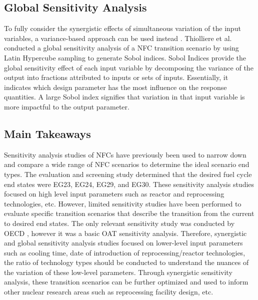 \subsection{Global Sensitivity Analysis}
\label{sec:sobol}
To fully consider the synergistic effects of
simultaneous variation of the input variables, a variance-based 
approach can be used instead \cite{thiolliere_methodology_2018}.
Thiolliere et al. conducted a global sensitivity analysis of a 
\gls{NFC} transition scenario by using Latin Hypercube sampling 
to generate Sobol indices. 
Sobol Indices provide the global sensitivity effect of each 
input variable by decomposing the variance of the output into 
fractions attributed to inputs or sets of inputs.
Essentially, it indicates which design parameter has 
the most influence on the response quantities.
A large Sobol index signifies that variation in that input 
variable is more impactful to the output parameter.

\subsection{Main Takeaways}
Sensitivity analysis studies of \glspl{NFC} have previously been used to narrow 
down and compare a wide range of \gls{NFC} scenarios to determine 
the ideal scenario end types. 
The evaluation and screening study determined that the desired 
fuel cycle end states were EG23, EG24, EG29, and EG30.
These sensitivity analysis studies focused on high level input 
parameters such as reactor and reprocessing technologies, etc.
However, limited sensitivity studies have been performed to 
evaluate specific transition scenarios that describe the transition 
from the current to desired end states.
The only relevant sensitivity study was conducted by OECD 
\cite{noauthor_effects_2017}, however it was a basic OAT 
sensitivity analysis.   
Therefore, synergistic and global sensitivity analysis studies focused on
lower-level input parameters such as cooling time, 
date of introduction of reprocessing/reactor 
technologies, the ratio of technology types should be conducted to 
understand the nuances of the variation of these low-level parameters. 
Through synergistic sensitivity analysis, these transition scenarios can be 
further optimized and used to inform other nuclear research areas 
such as reprocessing facility design, etc. 